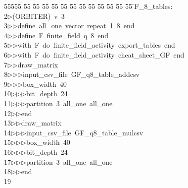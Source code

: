 %
%
\begin{tabbing}
55555 \= 55 \= 55 \= 55 \= 55 \= 55 \= 55 \= 55 \= 55 \= 55 \= 55 \= 55 \= 55 \= \>F\_8\_tables:\\[0pt]
2\>$\triangleright$\>(ORBITER)\ v\ 3\ \\[0pt]
3\>$\triangleright$\>$\triangleright$\>define\ all\_one\ vector\ repeat\ 1\ 8\ end\ \\[0pt]
4\>$\triangleright$\>$\triangleright$\>define\ F\ finite\_field\ q\ 8\ end\ \\[0pt]
5\>$\triangleright$\>$\triangleright$\>with\ F\ do\ finite\_field\_activity\ export\_tables\ end\ \\[0pt]
6\>$\triangleright$\>$\triangleright$\>with\ F\ do\ finite\_field\_activity\ cheat\_sheet\_GF\ end\ \\[0pt]
7\>$\triangleright$\>$\triangleright$\>draw\_matrix\ \\[0pt]
8\>$\triangleright$\>$\triangleright$\>$\triangleright$\>input\_csv\_file\ GF\_q8\_table\_addcsv\ \\[0pt]
9\>$\triangleright$\>$\triangleright$\>$\triangleright$\>box\_width\ 40\ \\[0pt]
10\>$\triangleright$\>$\triangleright$\>$\triangleright$\>bit\_depth\ 24\ \\[0pt]
11\>$\triangleright$\>$\triangleright$\>$\triangleright$\>partition\ 3\ all\_one\ all\_one\ \\[0pt]
12\>$\triangleright$\>$\triangleright$\>end\ \\[0pt]
13\>$\triangleright$\>$\triangleright$\>draw\_matrix\ \\[0pt]
14\>$\triangleright$\>$\triangleright$\>$\triangleright$\>input\_csv\_file\ GF\_q8\_table\_mulcsv\ \\[0pt]
15\>$\triangleright$\>$\triangleright$\>$\triangleright$\>box\_width\ 40\ \\[0pt]
16\>$\triangleright$\>$\triangleright$\>$\triangleright$\>bit\_depth\ 24\ \\[0pt]
17\>$\triangleright$\>$\triangleright$\>$\triangleright$\>partition\ 3\ all\_one\ all\_one\ \\[0pt]
18\>$\triangleright$\>$\triangleright$\>end\\[0pt]
19\>\end{tabbing}
